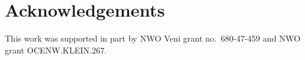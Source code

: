 \documentclass[aos]{imsart}
\theoremstyle{definition}
\begin{document}
\section*{Acknowledgements}
This work was supported in part by NWO Veni grant no.~680-47-459 and NWO grant OCENW.KLEIN.267.




\end{document}
